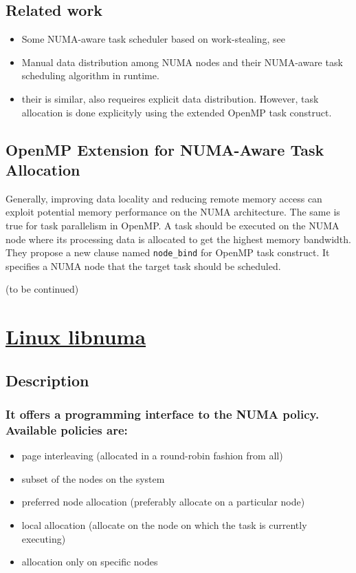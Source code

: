 \documentclass[11pt]{article}
\begin{document}
\subsection{Related work}
\label{sec-5-3}
\begin{itemize}
\item Some NUMA-aware task scheduler based on work-stealing, see \cite{vikranth13_topol_aware_task_steal_chip,DBLP:journals/corr/Tahan14,drebes14_topol_aware_depen_aware_sched,olivier12_openm_task_sched_strat_multic_numa_system}
\item Manual data distribution among NUMA nodes and their NUMA-aware task scheduling algorithm in runtime. \cite{muddukrishna15_local_aware_task_sched_data}
\item their is similar, also requeires explicit data distribution. However, task allocation is done explicityly using the extended OpenMP task construct.
\end{itemize}

\subsection{OpenMP Extension for NUMA-Aware Task Allocation}
\label{sec-5-4}
Generally, improving data locality and reducing remote memory access can exploit potential memory performance on the NUMA architecture. The same is true for task parallelism in OpenMP. A task should be executed on the NUMA node where its processing data is allocated to get the highest memory bandwidth. They propose a new clause named \verb~node_bind~ for OpenMP task construct. It specifies a NUMA node that the target task should be scheduled.

(to be continued)
\section{\href{http://man7.org/linux/man-pages/man3/numa.3.html}{Linux libnuma}}
\label{sec-6}
\subsection{Description}
\label{sec-6-1}
\subsubsection{It offers a programming interface to the NUMA policy. Available policies are:}
\label{sec-6-1-1}
\begin{itemize}
\item page interleaving (allocated in a round-robin fashion from all)
\item subset of the nodes on the system
\item preferred node allocation (preferably allocate on a particular node)
\item local allocation (allocate on the node on which the task is currently executing)
\item allocation only on specific nodes
\end{itemize}
\end{document}
